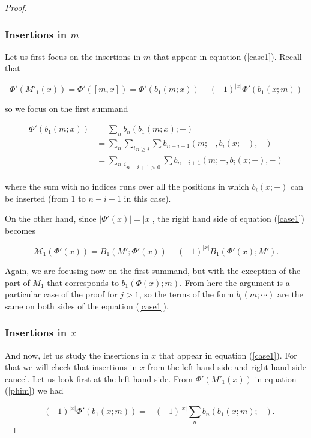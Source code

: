 \documentclass[Thesis.tex]{subfiles}
\begin{document}
\begin{proof}
\subsubsection*{Insertions in $m$}

Let us first focus on the insertions in $m$ that appear in equation (\ref{case1}). Recall that 

\begin{equation}\label{phim}
\Phi'(M'_1(x))=\Phi'([m,x])=\Phi'(b_1(m;x))-(-1)^{|x|}\Phi'(b_1(x;m))
\end{equation}

so we focus on the first summand

\begin{align*}
\Phi'(b_1(m;x))&=\sum_n b_n(b_1(m;x);-)\\
&=\sum_n \underset{n\geq i}{\sum_i} \sum b_{n-i+1}(m;-, b_i(x;-),-)\\
&=\underset{n-i+1> 0}{\sum_{n,i}}\sum b_{n-i+1}(m;-, b_i(x;-),-)
\end{align*}

where the sum with no indices runs over all the positions in which $b_i(x;-)$ can be inserted (from $1$ to $n-i+1$ in this case). 


On the other hand, since $|\Phi'(x)|=|x|$, the right hand side of equation (\ref{case1}) becomes

\begin{equation}\label{mphi}
\mathcal{M}_1(\Phi'(x))=B_1(M';\Phi'(x))-(-1)^{|x|}B_1(\Phi'(x);M').
\end{equation}

Again, we are focusing now on the first summand, but with the exception of the part of $M_1$ that corresponds to $b_1(\Phi(x);m)$. From here the argument is a particular case of the proof for $j>1$, so the terms of the form $b_l(m;\cdots)$ are the same on both sides of the equation (\ref{case1}). 




\subsubsection*{Insertions in $x$}

And now, let us study the insertions in $x$ that appear in equation (\ref{case1}). For that we will check that insertions in $x$ from the left hand side and right hand side cancel. Let us look first at the left hand side. From $\Phi'(M'_1(x))$ in equation (\ref{phim}) we had 

\[-(-1)^{|x|}\Phi'(b_1(x;m))=-(-1)^{|x|}\sum_n b_n(b_1(x;m);-).\]


\end{proof}
\end{document}
